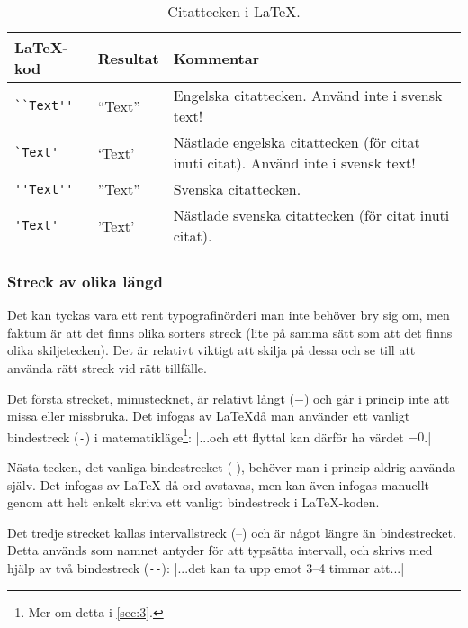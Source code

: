 \documentclass[lang=sv,ptsize=10pt,font=none,nomath,titles=bf,../../a4.tex]{subfiles}
\begin{document}
\begin{table}[tbp]
	\centering 
	\caption{Citattecken i \LaTeX.}
	\label{tab:citat}
	\begin{tabular}{l l p{}}
		\toprule 
		\LaTeX-kod & Resultat & Kommentar \\ 
		\midrule 
		\verb|``Text''| & “Text” & Engelska citattecken. Använd inte i
		svensk text! \\
		\verb|`Text'| & ‘Text’ & Nästlade engelska citattecken (för citat
		inuti citat). Använd inte i svensk text! \\ 
		\verb|''Text''| & ”Text” & Svenska citattecken. \\
		\verb|'Text'| & ’Text’ & Nästlade svenska citattecken (för citat
		inuti citat). \\
		\bottomrule 
	\end{tabular}
\end{table}

\subsubsection{Streck av olika längd}
Det kan tyckas vara ett rent typografinörderi man inte behöver bry sig om,
men faktum är att det finns olika sorters streck (lite på samma sätt som
att det finns olika skiljetecken). Det är relativt viktigt att skilja på
dessa och se till att använda rätt streck vid rätt tillfälle.

Det första strecket, minustecknet, är relativt långt (\(-\)) och går i
princip inte att missa eller missbruka. Det infogas av \LaTeX då man
använder ett vanligt bindestreck (\verb|-|) i matematikläge\footnote{
Mer om detta i \cref{sec:3}.}:
\latex|...och ett flyttal kan därför ha värdet \(-0\).|

Nästa tecken, det vanliga bindestrecket (-), behöver man i princip aldrig
använda själv. Det infogas av \LaTeX{} då ord avstavas, men kan även
infogas manuellt genom att helt enkelt skriva ett vanligt bindestreck
i \LaTeX{}-koden.

Det tredje strecket kallas intervallstreck (–) och är något längre än
bindestrecket. Detta används som namnet antyder för att typsätta
intervall, och skrivs med hjälp av två bindestreck (\verb|--|):
\latex|...det kan ta upp emot 3--4 timmar att...|
\end{document}
